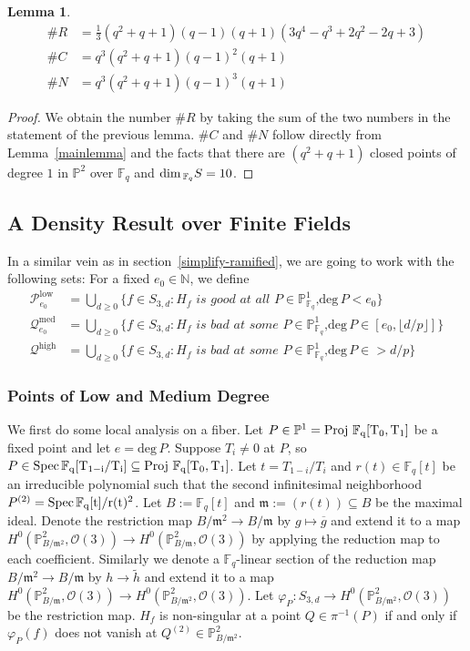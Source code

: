 \documentclass[12pt]{article}
\theoremstyle{plain}
\newtheorem{lemma}[equation]{Lemma}
\theoremstyle{definition}
\newcommand{\fm}{\mathfrak{m}}
\newcommand{\IN}{\mathbb{N}}
\newcommand{\IF}{\mathbb{F}}
\newcommand{\IP}{\mathbb{P}}
\newcommand{\sO}{\mathcal{O}}
\newcommand{\sP}{\mathcal{P}}
\newcommand{\sQ}{\mathcal{Q}}
\renewcommand{\deg}{\mathrm{deg}\,}
\newcommand{\Spec}{\rm Spec\,}
\newcommand{\Proj}{\rm Proj\,}
\renewcommand\dim{{\rm dim\,}}
\newcommand\union{\bigcup}
\newcommand{\<}{\langle}
\renewcommand{\>}{\rangle}
\def\wt{\widetilde}
\begin{document}
\begin{lemma}
\begin{align*}
\# R &= \frac{1}{3}(q^2 + q + 1)(q - 1) (q + 1)(3q^4 - q^3 + 2 q^2 - 2q + 3)\\
\# C &= q^3 (q^2 + q + 1) (q - 1)^2 (q + 1) \\
\# N &= q^3 (q^2 + q + 1) (q - 1)^3 (q + 1)
\end{align*}
\end{lemma}
\begin{proof}
We obtain the number $\# R$ by taking the sum of the two numbers in the statement of the previous lemma.
$\# C$ and $\# N$ follow directly from Lemma~\ref{mainlemma} and the facts that there are $(q^2 + q + 1)$ closed points of degree $1$ in $\IP^2$ over $\IF_q$ and $\dim_{\IF_q} S = 10$. 
\end{proof}


\subsection{A Density Result over Finite Fields}
In a similar vein as in section~\ref{simplify-ramified}, we are going to work with the following sets:
For a fixed $e_0 \in \IN$, we define 
\begin{align*}
\sP_{e_0}^{\mathrm{low}} &= \union_{d \ge 0} \{ f \in S_{3, d} : H_f \textit{ is good at all $P \in \IP^1_{\IF_q}$,}\deg P < e_0\}\\
\sQ_{e_0}^{\mathrm{med}} &= \union_{d \ge 0} \{f \in S_{3, d} : H_f \textit{ is bad at some $P \in \IP^1_{\IF_q}$,}\deg P \in [e_0, \lfloor d/p \rfloor]\}\\
\sQ^{\mathrm{high}} &= \union_{d \ge 0} \{f \in S_{3, d} : H_f \textit{ is bad at some $P \in \IP^1_{\IF_q}$,}\deg P \in > d/p\}
\end{align*}
\subsubsection{Points of Low and Medium Degree}
 

We first do some local analysis on a fiber. Let $P \in \IP^1 = \Proj \, \IF_q[T_0, T_1]$ be a fixed point and let $e = \deg P$. Suppose $T_i \neq 0$ at $P$, so $P \in \Spec \IF_q[T_{1-i}/T_i] \subseteq \Proj \, \IF_q[T_0, T_1]$. Let $t = T_{1-i}/T_i$ and $r(t) \in \IF_q[t]$ be an irreducible polynomial such that the second infinitesimal neighborhood $P^{(2)} = \Spec \IF_q[t]/r(t)^2$. Let $B := \IF_q[t]$ and $\fm := (r(t)) \subseteq B$ be the maximal ideal. Denote the restriction map $B/\fm^2 \to B/\fm$ by $g \mapsto \overline{g}$ and extend it to a map $H^0(\IP^2_{B/\fm^2}, \sO(3)) \to H^0(\IP^2_{B/\fm}, \sO(3))$ by applying the reduction map to each coefficient. Similarly we denote a $\IF_q$-linear section of the reduction map $B/\fm^2 \to B/\fm$ by $h \to \wt{h}$ and extend it to a map $H^0(\IP^2_{B/\fm}, \sO(3)) \to H^0(\IP^2_{B/\fm^2}, \sO(3))$. Let $\varphi_P : S_{3, d} \to H^0(\IP^2_{B/\fm^2}, \sO(3))$ be the restriction map. $H_f$ is non-singular at a point $Q \in \pi^{-1}(P)$ if and only if $\varphi_P(f)$ does not vanish at $Q^{(2)} \in \IP^2_{B/\fm^2}$. 
\end{document}
